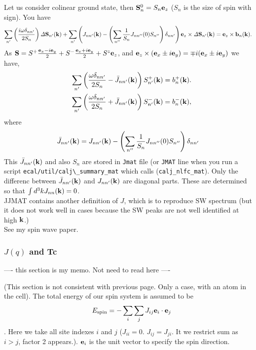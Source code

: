 \documentclass[a4paper,10pt,epsf,fleqn]{article}
\newcommand{\bfe}{{\bf e}}
\newcommand{\bfk}{{\bf k}}
\newcommand{\bfex}{{\bf e}_x}
\newcommand{\bfey}{{\bf e}_y}
\newcommand{\bfez}{{\bf e}_z}
\newcommand{\bfb}{{\bf b}}
\newcommand{\bfS}{{\bf S}}
\newcommand{\bfiS}{{\it \Delta \bf S}}
\begin{document}
Let us consider colinear ground state, then $\bfS^0_{n}= S_n \bfe_z$
($S_n$ is the size of spin with sign). You have
\begin{eqnarray}
\sum_{n'} \left( \frac{i \omega \delta_{nn'}}{2S_n} \right) \bfiS_{n'}(\bfk)
+\sum_{n'} \left( J_{n n'}(\bfk) 
- \left( \sum_{n''} \frac{1}{S_n} J_{n n''}(0) S_{n''} \right) \delta_{nn'}\right)  \bfez \times \bfiS_{n'}(\bfk)
=  \bfez \times \bfb_{n}(\bfk).
\label{hei6}
\end{eqnarray}
As $\bfS = S^+ \frac{\bfex -i \bfey}{2}
         + S^- \frac{\bfex +i \bfey}{2} + S^z \bfez$,
and $\bfez \times ({\bfex \pm i \bfey}) = \mp i({\bfex \pm i \bfey})$
we have,
\begin{eqnarray}
&&\sum_{n'} \left( \frac{\omega \delta_{nn'}} {2S_n} -
 \bar{J}_{n n'}(\bfk) \right)  S^+_{n'}(\bfk)
=  b^+_{n}(\bfk). \\
&&\sum_{n'} \left( \frac{\omega \delta_{nn'}} {2S_n} + 
\bar{J}_{nn'}(\bfk)  \right)    S^-_{n'}(\bfk)
=  b^-_{n}(\bfk),
\end{eqnarray}
where
\begin{eqnarray}
\bar{J}_{nn'}(\bfk)=  J_{n n'}(\bfk) 
- \left( \sum_{n''} \frac{1}{S_n} J_{n n''}(0) S_{n''} \right) \delta_{nn'}
\label{jbar}
\end{eqnarray}
This $\bar{J}_{nn'}(\bfk)$ and also $S_n $ are stored in \verb#Jmat# file
(or \verb#JMAT# line when you run a script \verb#ecal/util/calj\_summary_mat# 
which calls (\verb#calj_nlfc_mat#). 
Only the differenc between $\bar{J}_{nn'}(\bfk)$ and $J_{n n'}(\bfk)$
are diagonal parts. 
These are determined so that $\int d^3k {J}_{nn}(\bfk)=0$.\\

\noindent JJMAT contains another definition of $J$, which is to reproduce SW spectrum
(but it does not work well in cases because the SW peaks are not well identified at high $\bfk$.)\\

See my spin wave paper.


\subsubsection{$J(q)$ and Tc}
---- this section is my memo. Not need to read here ----

(This section is not consistent with previous page. Only a case, with an atom in the cell).
The total energy of our spin system is assumed to be
\begin{eqnarray}
&& E_{\rm spin} = - \sum_i \sum_j J_{ij} \bfe_i \cdot \bfe_j
\label{heis1}
\end{eqnarray}
. Here we take all site indexes $i$ and $j$ 
($J_{ii}=0$. $J_{ij}=J_{ji}$. 
It we restrict sum as $i>j$, factor 2 appears.).
$\bfe_i$ is the unit vector to specify the spin direction.
\end{document}
